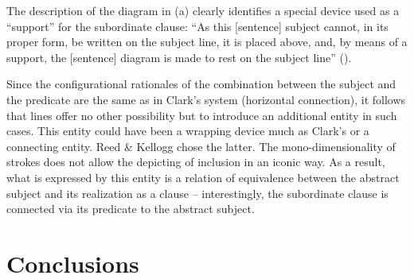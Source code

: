 \documentclass[output=paper]{langsci/langscibook}
\begin{document}
The description of the diagram in (a) clearly identifies a special device used as a “support” for the subordinate clause: “As this [sentence] subject cannot, in its proper form, be written on the subject line, it is placed above, and, by means of a support, the [sentence] diagram is made to rest on the subject line” (\citealt[107]{reed_graded_1879}).

Since the configurational rationales of the combination between the subject and the predicate are the same as in Clark’s system (horizontal connection), it follows that lines offer no other possibility but to introduce an additional entity in such cases. This entity could have been a wrapping device much as Clark’s or a connecting entity. Reed \& Kellogg chose the latter. The mono-dimensionality of strokes does not allow the depicting of inclusion in an iconic way. As a result, what is expressed by this entity is a relation of equivalence between the abstract subject and its realization as a clause – interestingly, the subordinate clause is connected via its predicate to the abstract subject.

\section{Conclusions}
\end{document}
